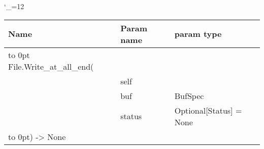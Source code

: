 \begingroup \catcode`\_=12 \tt
\begin{tabular}{lll}
\toprule
\textrm{Name}&\textrm{Param name}&\textrm{param type}\\
\midrule
\hbox to 0pt {File.Write_at_all_end(\hss}\\
& self\\
& buf & BufSpec\\
& status & Optional[Status] = None\\
\hbox to 0pt{) -> None\hss}\\
\bottomrule
\end{tabular}
\endgroup
